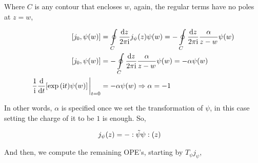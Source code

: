 Where $C$ is any contour that encloses $w$, again, the regular terms have no poles at $z=w$,

\begin{align*}
    \comm{j_0}{\psi\qty(w)}&=\oint\limits_C\frac{\dd{z}}{2\pi\im}j_\psi\qty(z)\psi\qty(w)=-\oint\limits_C\frac{\dd{z}}{2\pi\im}\frac{\alpha}{z-w}\psi\qty(w)\\
    \comm{j_0}{\psi\qty(w)}&=-\oint\limits_C\frac{\dd{z}}{2\pi\im}\frac{\alpha}{z-w}\psi\qty(w)=-\alpha\psi\qty(w)\\
    \frac{1}{\im}\dv{}{t}\qty[\exp\qty(\im t)\psi\qty(w)]\eval_{t=0}&=-\alpha\psi\qty(w)\Rightarrow \alpha=-1
\end{align*}

In other words, $\alpha$ is specified once we set the transformation of $\psi$, in this case setting the charge of it to be $1$ is enough. So,

\begin{align*}
    j_\psi\qty(z)&=-:\tilde\psi\psi:\qty(z)
\end{align*}

And then, we compute the remaining OPE's, starting by $T_\psi j_\psi$,


